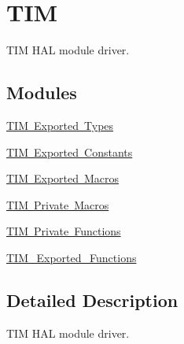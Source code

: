 \hypertarget{group___t_i_m}{}\section{T\+IM}
\label{group___t_i_m}


T\+IM H\+AL module driver.  


\subsection*{Modules}
\begin{DoxyCompactItemize}
\item 
\mbox{\hyperlink{group___t_i_m___exported___types}{T\+I\+M Exported Types}}
\item 
\mbox{\hyperlink{group___t_i_m___exported___constants}{T\+I\+M Exported Constants}}
\item 
\mbox{\hyperlink{group___t_i_m___exported___macros}{T\+I\+M Exported Macros}}
\item 
\mbox{\hyperlink{group___t_i_m___private___macros}{T\+I\+M Private Macros}}
\item 
\mbox{\hyperlink{group___t_i_m___private___functions}{T\+I\+M Private Functions}}
\item 
\mbox{\hyperlink{group___t_i_m___exported___functions}{T\+I\+M\+\_\+\+Exported\+\_\+\+Functions}}
\end{DoxyCompactItemize}


\subsection{Detailed Description}
T\+IM H\+AL module driver. 

